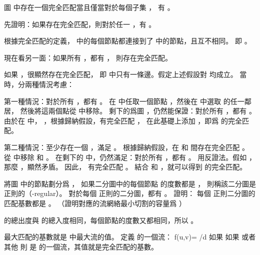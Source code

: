 圖  中存在一個完全匹配當且僅當對於每個子集 ，
有 。
\stopEXERCISE

\startANSWER
先證明：如果存在完全匹配，則對於任一 ，有 。

根據完全匹配的定義，  中的每個節點都連接到了  中的節點，且互不相同。
即 。

現在看另一面：如果所有 ，都有 ，
則存在完全匹配。

如果 ，很顯然存在完全匹配，
即  中只有一條邊。假定上述假設對  均成立。
當  時，分兩種情況考慮：

第一種情況：對於所有 ，都有 。
在  中任取一個節點 ，然後在  中選取  的任一鄰居，
然後將這兩個點從  中移除。
剩下的爲圖 ，仍然能保證：對於所有 ，都有 。
由於在  中， ，根據歸納假設，有完全匹配 ，
在此基礎上添加 ，即爲  的完全匹配。

第二種情況：至少存在一個 ，滿足 。
根據歸納假設，在  和  間存在完全匹配 。
從  中移除  和 。
在剩下的  中，仍然滿足：對於所有 ，都有 。
用反證法。假如 ，那麼 ，顯然矛盾。
因此，  有完全匹配 。
結合  和 ，就可以得到  的完全匹配。
\stopANSWER

\startEXERCISE\DIFFICULT
將圖  中的節點劃分爲 ，
如果二分圖中的每個節點  的度數都是 ，
則稱該二分圖是 {\EMP {} 正則的（-regular）}。
對於每個  正則的二分圖，都有 。
證明：
每個  正則二分圖的匹配基數都是 。
（\hint 證明對應的流網絡最小切割的容量爲 ）
\stopEXERCISE

\startANSWER
{} 的總出度與  的總入度相同，每個節點的度數又都相同，所以 。

最大匹配的基數就是  中最大流的值。
定義  的一個流：
\startformula
f(u,v)=\startcases
{}/d \NC 如果  \NR
{}   \NC 如果  或者  \NR
{}   \NC 其他 \NR
\stopcases
\stopformula
則  是  的一個流，其值就是完全匹配的基數。
\stopANSWER

\stopsection
